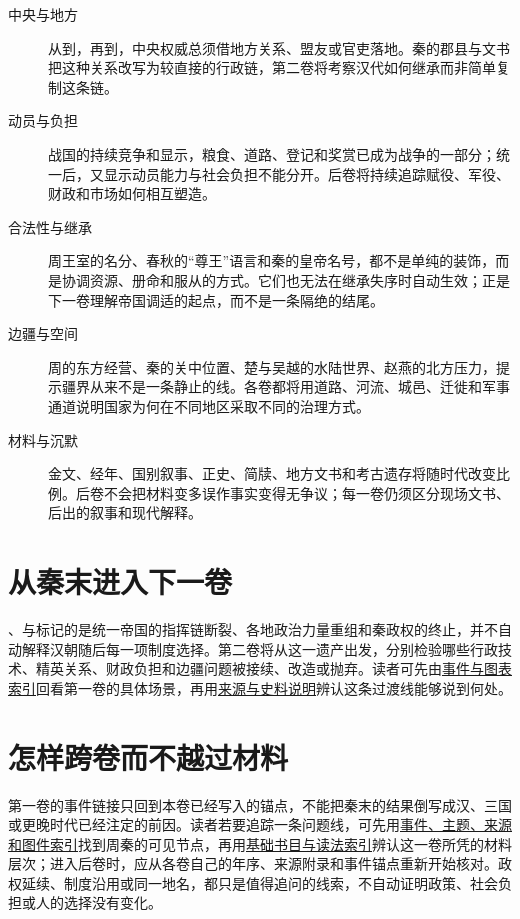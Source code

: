 \begin{description}
  \item[中央与地方] 从到，再到，中央权威总须借地方关系、盟友或官吏落地。秦的郡县与文书把这种关系改写为较直接的行政链，第二卷将考察汉代如何继承而非简单复制这条链。
  \item[动员与负担] 战国的持续竞争和显示，粮食、道路、登记和奖赏已成为战争的一部分；统一后，又显示动员能力与社会负担不能分开。后卷将持续追踪赋役、军役、财政和市场如何相互塑造。
  \item[合法性与继承] 周王室的名分、春秋的“尊王”语言和秦的皇帝名号，都不是单纯的装饰，而是协调资源、册命和服从的方式。它们也无法在继承失序时自动生效；正是下一卷理解帝国调适的起点，而不是一条隔绝的结尾。
  \item[边疆与空间] 周的东方经营、秦的关中位置、楚与吴越的水陆世界、赵燕的北方压力，提示疆界从来不是一条静止的线。各卷都将用道路、河流、城邑、迁徙和军事通道说明国家为何在不同地区采取不同的治理方式。
  \item[材料与沉默] 金文、经年、国别叙事、正史、简牍、地方文书和考古遗存将随时代改变比例。后卷不会把材料变多误作事实变得无争议；每一卷仍须区分现场文书、后出的叙事和现代解释。
\end{description}

\section{从秦末进入下一卷}

、与标记的是统一帝国的指挥链断裂、各地政治力量重组和秦政权的终止，并不自动解释汉朝随后每一项制度选择。第二卷将从这一遗产出发，分别检验哪些行政技术、精英关系、财政负担和边疆问题被接续、改造或抛弃。读者可先由\hyperref[app:index]{事件与图表索引}回看第一卷的具体场景，再用\hyperref[app:sources]{来源与史料说明}辨认这条过渡线能够说到何处。

\section{怎样跨卷而不越过材料}

第一卷的事件链接只回到本卷已经写入的锚点，不能把秦末的结果倒写成汉、三国或更晚时代已经注定的前因。读者若要追踪一条问题线，可先用\hyperref[app:index]{事件、主题、来源和图件索引}找到周秦的可见节点，再用\hyperref[app:bibliography]{基础书目与读法索引}辨认这一卷所凭的材料层次；进入后卷时，应从各卷自己的年序、来源附录和事件锚点重新开始核对。政权延续、制度沿用或同一地名，都只是值得追问的线索，不自动证明政策、社会负担或人的选择没有变化。
